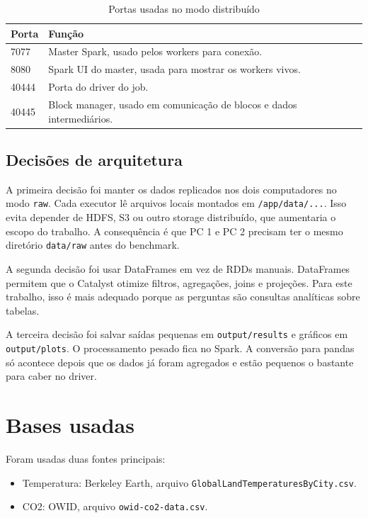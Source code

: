 \documentclass[12pt,a4paper]{article}
\begin{document}
\begin{table}[H]
\centering
\caption{Portas usadas no modo distribuído}
\begin{tabular}{ll}
\toprule
Porta & Função \\
\midrule
7077 & Master Spark, usado pelos workers para conexão. \\
8080 & Spark UI do master, usada para mostrar os workers vivos. \\
40444 & Porta do driver do job. \\
40445 & Block manager, usado em comunicação de blocos e dados intermediários. \\
\bottomrule
\end{tabular}
\end{table}

\subsection{Decisões de arquitetura}

A primeira decisão foi manter os dados replicados nos dois computadores no modo \texttt{raw}. Cada executor lê arquivos locais montados em \texttt{/app/data/...}. Isso evita depender de HDFS, S3 ou outro storage distribuído, que aumentaria o escopo do trabalho. A consequência é que PC 1 e PC 2 precisam ter o mesmo diretório \texttt{data/raw} antes do benchmark.

A segunda decisão foi usar DataFrames em vez de RDDs manuais. DataFrames permitem que o Catalyst otimize filtros, agregações, joins e projeções. Para este trabalho, isso é mais adequado porque as perguntas são consultas analíticas sobre tabelas.

A terceira decisão foi salvar saídas pequenas em \texttt{output/results} e gráficos em \texttt{output/plots}. O processamento pesado fica no Spark. A conversão para pandas só acontece depois que os dados já foram agregados e estão pequenos o bastante para caber no driver.

\section{Bases usadas}

Foram usadas duas fontes principais:

\begin{itemize}
    \item Temperatura: Berkeley Earth, arquivo \texttt{GlobalLandTemperaturesByCity.csv}.
    \item CO2: OWID, arquivo \texttt{owid-co2-data.csv}.
\end{itemize}
\end{document}
